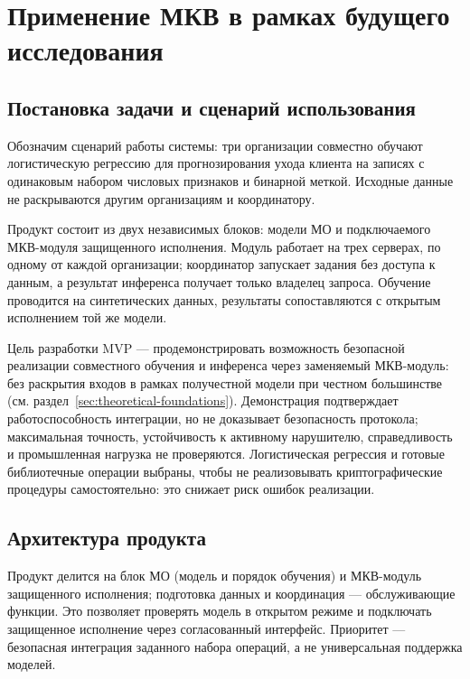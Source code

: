\section{Применение МКВ в рамках будущего исследования}
\label{sec:future-research}

\subsection{Постановка задачи и сценарий использования}
\label{subsec:mvp-scenario}

Обозначим сценарий работы системы: три организации совместно обучают логистическую регрессию для прогнозирования ухода клиента на записях с одинаковым набором числовых признаков и бинарной меткой. Исходные данные не раскрываются другим организациям и координатору.

Продукт состоит из двух независимых блоков: модели МО и подключаемого МКВ-модуля защищенного исполнения. Модуль работает на трех серверах, по одному от каждой организации; координатор запускает задания без доступа к данным, а результат инференса получает только владелец запроса. Обучение проводится на синтетических данных, результаты сопоставляются с открытым исполнением той же модели.

Цель разработки MVP --- продемонстрировать возможность безопасной реализации совместного обучения и инференса через заменяемый МКВ-модуль: без раскрытия входов в рамках получестной модели при честном большинстве (см. раздел~\ref{sec:theoretical-foundations}). Демонстрация подтверждает работоспособность интеграции, но не доказывает безопасность протокола; максимальная точность, устойчивость к активному нарушителю, справедливость и промышленная нагрузка не проверяются. Логистическая регрессия и готовые библиотечные операции выбраны, чтобы не реализовывать криптографические процедуры самостоятельно: это снижает риск ошибок реализации.

\subsection{Архитектура продукта}
\label{subsec:product-architecture}

Продукт делится на блок МО (модель и порядок обучения) и МКВ-модуль защищенного исполнения; подготовка данных и координация --- обслуживающие функции. Это позволяет проверять модель в открытом режиме и подключать защищенное исполнение через согласованный интерфейс. Приоритет --- безопасная интеграция заданного набора операций, а не универсальная поддержка моделей.

